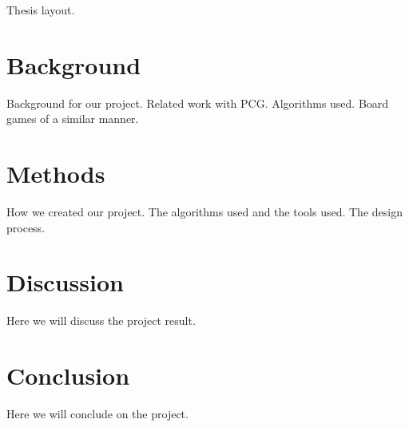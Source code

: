 \documentclass[a4paper,11pt]{article}
\begin{document}
Thesis layout.
\pagebreak
\section{Background}
Background for our project. 
Related work with PCG.
Algorithms used.
Board games of a similar manner.

\section{Methods}
How we created our project. 
The algorithms used and the tools used.
The design process.

\section{Discussion}
Here we will discuss the project result.

\section{Conclusion}
Here we will conclude on the project.

\pagebreak
{}


\pagebreak
\end{document}
